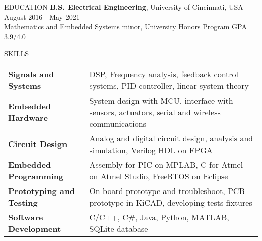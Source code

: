 \documentclass{../lib/resume} %
\begin{document}

    \begin{rSection}{EDUCATION}
        {\bf B.S. Electrical Engineering}, University of Cincinnati, USA \hfill {August 2016 - May 2021}\\
        Mathematics and Embedded Systems minor, University Honors Program \hfill {GPA 3.9/4.0}




    \end{rSection}

    \begin{rSection}{SKILLS}

        \begin{tabular}{ @{} >{\bfseries}l @{\hspace{2ex}} l }
            Signals and Systems & DSP, Frequency analysis, feedback control systems, PID controller, linear system theory	\\
            Embedded Hardware & System design with MCU, interface with sensors, actuators, serial and wireless communications \\
            Circuit Design & Analog and digital circuit design, analysis and simulation, Verilog HDL on FPGA \\
            Embedded Programming & Assembly for PIC on MPLAB, C for Atmel on Atmel Studio, FreeRTOS on Eclipse \\
            Prototyping and Testing &  On-board prototype and troubleshoot, PCB prototype in KiCAD, developing tests fixtures \\
            Software Development & C/C++, C\#, Java, Python, MATLAB, SQLite database \\
        \end{tabular}
    \end{rSection}
\end{document}

